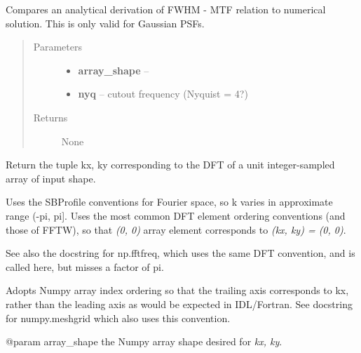 \documentclass[a4paper,11pt,english]{sphinxmanual}
\begin{document}

\begin{fulllineitems}
\label{instrument:sandbox.MTF.compareAnalytical}
Compares an analytical derivation of FWHM - MTF relation to numerical solution.
This is only valid for Gaussian PSFs.
\begin{quote}\begin{description}
\item[{Parameters}] \leavevmode\begin{itemize}
\item {} 
\textbf{array\_shape} -- 

\item {} 
\textbf{nyq} -- cutout frequency (Nyquist = 4?)

\end{itemize}

\item[{Returns}] \leavevmode
None

\end{description}\end{quote}

\end{fulllineitems}


\begin{fulllineitems}
\label{instrument:sandbox.MTF.kxky}
Return the tuple kx, ky corresponding to the DFT of a unit integer-sampled array of input
shape.

Uses the SBProfile conventions for Fourier space, so k varies in approximate range (-pi, pi{]}.
Uses the most common DFT element ordering conventions (and those of FFTW), so that \emph{(0, 0)}
array element corresponds to \emph{(kx, ky) = (0, 0)}.

See also the docstring for np.fftfreq, which uses the same DFT convention, and is called here,
but misses a factor of pi.

Adopts Numpy array index ordering so that the trailing axis corresponds to kx, rather than the
leading axis as would be expected in IDL/Fortran.  See docstring for numpy.meshgrid which also
uses this convention.

@param array\_shape   the Numpy array shape desired for \emph{kx, ky}.

\end{fulllineitems}
\end{document}
